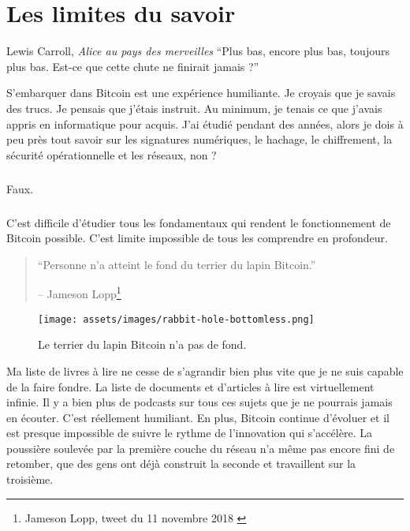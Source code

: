 \chapter{Les limites du savoir}
\label{les:7}

\begin{chapquote}{Lewis Carroll, \textit{Alice au pays des merveilles}}
\enquote{Plus bas, encore plus bas, toujours plus bas. Est-ce que cette chute ne
finirait jamais ?}
\end{chapquote}

S'embarquer dans Bitcoin est une expérience humiliante. Je croyais que je savais
des trucs. Je pensais que j'étais instruit. Au minimum, je tenais ce que j'avais
appris en informatique pour acquis. J'ai étudié pendant des années, alors je
dois à peu près tout savoir sur les signatures numériques, le hachage, le
chiffrement, la sécurité opérationnelle et les réseaux, non ?

\paragraph{}
Faux.

\paragraph{}
C'est difficile d'étudier tous les fondamentaux qui rendent le fonctionnement de
Bitcoin possible. C'est limite impossible de tous les comprendre en profondeur.

\begin{quotation}\begin{samepage}
\enquote{Personne n'a atteint le fond du terrier du lapin Bitcoin.}
\begin{flushright} -- Jameson Lopp\footnote{Jameson Lopp, tweet du 11 novembre
2018 \cite{lopp-tweet}}
\end{flushright}\end{samepage}\end{quotation}

\begin{figure}
  \centering
  \texttt{[image: assets/images/rabbit-hole-bottomless.png]}
  \caption{Le terrier du lapin Bitcoin n'a pas de fond.}
  \label{fig:rabbit-hole-bottomless}
\end{figure}

Ma liste de livres à lire ne cesse de s'agrandir bien plus vite que je ne suis
capable de la faire fondre. La liste de documents et d'articles à lire est
virtuellement infinie. Il y a bien plus de podcasts sur tous ces sujets que je
ne pourrais jamais en écouter. C'est réellement humiliant. En plus, Bitcoin
continue d'évoluer et il est presque impossible de suivre le rythme de
l'innovation qui s'accélère. La poussière soulevée par la première couche du
réseau n'a même pas encore fini de retomber, que des gens ont déjà construit la
seconde et travaillent sur la troisième.

